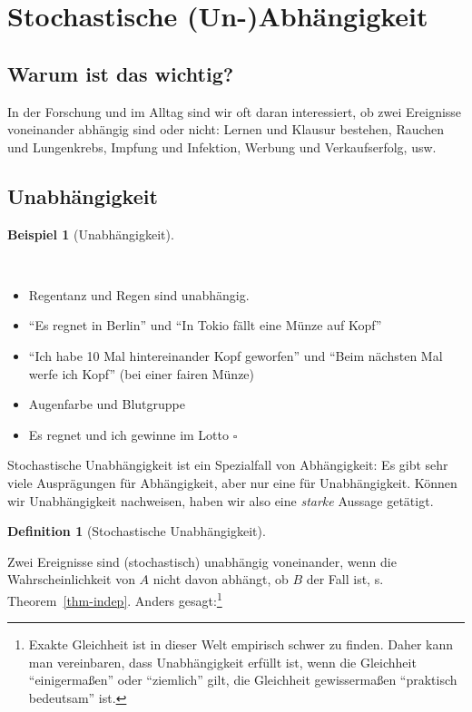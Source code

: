 \documentclass[
  ngerman,
  letterpaper,
  twoside,
  open=any]{scrbook}
\providecommand{\tightlist}{%
  \setlength{\itemsep}{0pt}\setlength{\parskip}{0pt}}\usepackage{longtable,booktabs,array}
\theoremstyle{definition}
\newtheorem{example}{Beispiel}[chapter]
\theoremstyle{plain}
\theoremstyle{definition}
\theoremstyle{definition}
\newtheorem{definition}{Definition}[chapter]
\theoremstyle{definition}
\newtheorem{example}{Beispiel}[chapter]
\theoremstyle{definition}
\theoremstyle{remark}
\begin{document}
\section{Stochastische
(Un-)Abhängigkeit}\label{stochastische-un-abhuxe4ngigkeit}

\subsection{Warum ist das wichtig?}\label{warum-ist-das-wichtig}

In der Forschung und im Alltag sind wir oft daran interessiert, ob zwei
Ereignisse voneinander abhängig sind oder nicht: Lernen und Klausur
bestehen, Rauchen und Lungenkrebs, Impfung und Infektion, Werbung und
Verkaufserfolg, usw.

\subsection{Unabhängigkeit}\label{unabhuxe4ngigkeit}

\begin{example}[Unabhängigkeit]\protect\hypertarget{exm-indep-intro}{}\label{exm-indep-intro}

~

\begin{itemize}
\tightlist
\item
  Regentanz und Regen sind unabhängig.
\item
  \enquote{Es regnet in Berlin} und \enquote{In Tokio fällt eine Münze
  auf Kopf}
\item
  \enquote{Ich habe 10 Mal hintereinander Kopf geworfen} und
  \enquote{Beim nächsten Mal werfe ich Kopf} (bei einer fairen Münze)
\item
  Augenfarbe und Blutgruppe
\item
  Es regnet und ich gewinne im Lotto \(\square\)
\end{itemize}

\end{example}

Stochastische Unabhängigkeit ist ein Spezialfall von Abhängigkeit: Es
gibt sehr viele Ausprägungen für Abhängigkeit, aber nur eine für
Unabhängigkeit. Können wir Unabhängigkeit nachweisen, haben wir also
eine \emph{starke} Aussage getätigt.

\begin{definition}[Stochastische
Unabhängigkeit]\protect\hypertarget{def-indep}{}\label{def-indep}

Zwei Ereignisse sind (stochastisch) unabhängig voneinander, wenn die
Wahrscheinlichkeit von \(A\) nicht davon abhängt, ob \(B\) der Fall ist,
s. Theorem~\ref{thm-indep}. Anders gesagt:\footnote{Exakte Gleichheit
  ist in dieser Welt empirisch schwer zu finden. Daher kann man
  vereinbaren, dass Unabhängigkeit erfüllt ist, wenn die Gleichheit
  \enquote{einigermaßen} oder \enquote{ziemlich} gilt, die Gleichheit
  gewissermaßen \enquote{praktisch bedeutsam} ist.}

\end{definition}
\end{document}
